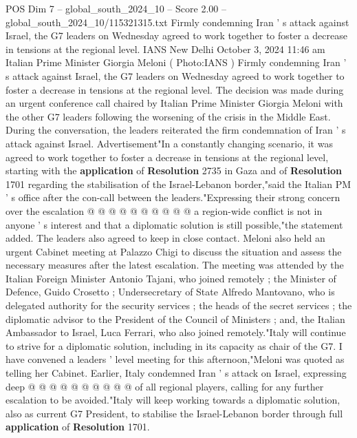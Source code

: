 \begin{textsample}{POS Dim 7 – global\_south\_2024\_10 – Score 2.00 – global\_south\_2024\_10/115321315.txt}  \label{ex:f7_pos_209}
Firmly condemning Iran ' s attack against Israel, the G7 leaders on Wednesday agreed to work together to foster a decrease in tensions at the regional level.
IANS New Delhi October 3, 2024 11:46 am Italian Prime Minister Giorgia Meloni ( Photo:IANS ) Firmly condemning Iran ' s attack against Israel, the G7 leaders on Wednesday agreed to work together to foster a decrease in tensions at the regional level.
The decision was made during an urgent conference call chaired by Italian Prime Minister Giorgia Meloni with the other G7 leaders following the worsening of the crisis in the Middle East.
During the conversation, the leaders reiterated the firm condemnation of Iran ' s attack against Israel.
Advertisement"In a constantly changing scenario, it was agreed to work together to foster a decrease in tensions at the regional level, starting with the \textbf{application} of \textbf{Resolution} 2735 in Gaza and of \textbf{Resolution} 1701 regarding the stabilisation of the Israel-Lebanon border,"said the Italian PM ' s office after the con-call between the leaders."Expressing their strong concern over the escalation @ @ @ @ @ @ @ @ @ @ a region-wide conflict is not in anyone ' s interest and that a diplomatic solution is still possible,"the statement added.
The leaders also agreed to keep in close contact.
Meloni also held an urgent Cabinet meeting at Palazzo Chigi to discuss the situation and assess the necessary measures after the latest escalation.
The meeting was attended by the Italian Foreign Minister Antonio Tajani, who joined remotely ; the Minister of Defence, Guido Crosetto ; Undersecretary of State Alfredo Mantovano, who is delegated authority for the security services ; the heads of the secret services ; the diplomatic advisor to the President of the Council of Ministers ; and, the Italian Ambassador to Israel, Luca Ferrari, who also joined remotely."Italy will continue to strive for a diplomatic solution, including in its capacity as chair of the G7.
I have convened a leaders ' level meeting for this afternoon,"Meloni was quoted as telling her Cabinet.
Earlier, Italy condemned Iran ' s attack on Israel, expressing deep @ @ @ @ @ @ @ @ @ @ of all regional players, calling for any further escalation to be avoided."Italy will keep working towards a diplomatic solution, also as current G7 President, to stabilise the Israel-Lebanon border through full \textbf{application} of \textbf{Resolution} 1701.

\end{textsample}
